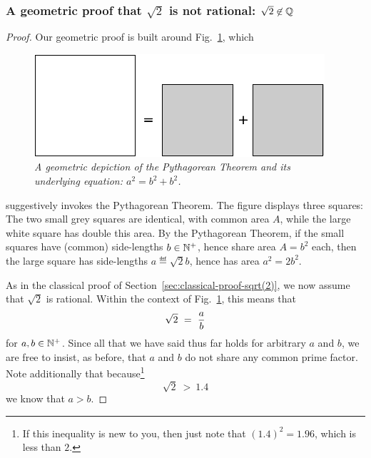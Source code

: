 \subsubsection{A geometric proof that $\sqrt{2}$ is not rational: $\sqrt{2} \not\in \mathbb{Q}$}
\label{sec:geom-proof-sqrt(2)}

\begin{proof}
Our geometric proof is built around Fig.~\ref{fig:irrationality1}, which
\begin{figure}[htb]
\begin{center}
       \includegraphics[scale=0.4]{FiguresArithmetic/sqrt2initial}
\caption{{\it A geometric depiction of the Pythagorean Theorem and its
    underlying equation: $a^2 = b^2 + b^2$.}
\label{fig:irrationality1}}
\end{center}
\end{figure}
suggestively invokes the Pythagorean Theorem.  The figure displays three squares: The two small grey squares are identical, with common area $A$, while the large white square has double this area.  By the Pythagorean Theorem, if the small squares have (common) side-lengths $b \in \mathbb{N}^+$, hence share area $A = b^2$ each, then the large square has side-lengths $a \eqdef \sqrt{2}b$, hence has area $a^2 = 2 b^2$.

As in the classical proof of Section~\ref{sec:classical-proof-sqrt(2)}, we now assume that $\sqrt{2}$ is rational.  Within the context of Fig.~\ref{fig:irrationality1}, this means that
\[ \sqrt{2} \ = \ {a \over b} \]
for $a, b \in \mathbb{N}^+$.  Since all that we have said thus far holds for arbitrary $a$ and $b$, we are free to insist, as before, that $a$ and $b$ do not share any common prime factor.  Note additionally that because\footnote{If this inequality is new to you, then just note that $(1.4)^2 = 1.96$, which is less than $2$.}
\[ \sqrt{2} \ > \ 1.4 \]
we know that $a > b$.

\bigskip

\noindent {}
\end{proof}
